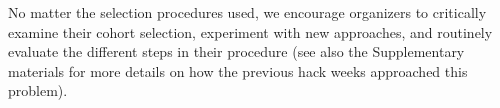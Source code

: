 No matter the selection procedures used, we encourage organizers to critically examine their cohort selection, experiment with new approaches, and routinely evaluate the different steps in their procedure%
(see also the Supplementary materials for more details on how the previous hack weeks approached this problem).



